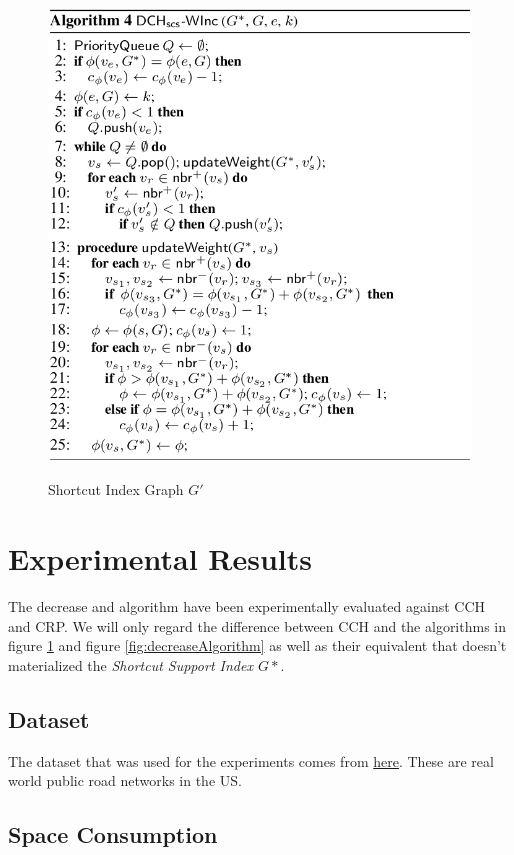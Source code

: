 \documentclass[twocolumn]{article}
\begin{document}
\begin{figure}[ht]
    \caption{Shortcut Index Graph $G'$}
    \centering
    \includegraphics[width=\linewidth]{increaseAlgorithm}
    \label{fig:increaseAlgorithm}
\end{figure}


\section{Experimental Results}

The decrease and algorithm have been experimentally evaluated against CCH and CRP. We will only regard the difference between 
CCH and the algorithms in figure \ref{fig:increaseAlgorithm} and figure \ref{fig:decreaseAlgorithm} as well as their equivalent
that doesn't materialized the \textit{Shortcut Support Index $G*$}. 

\subsection{Dataset}
The dataset that was used for the experiments comes from \href{http://www.dis.uniroma1.it/challenge9/download.shtml}{here}.
These are real world public road networks in the US.

\subsection{Space Consumption}
\end{document}
